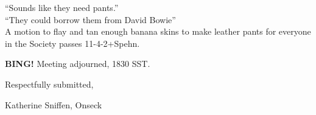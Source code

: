 \documentclass[10pt]{article}
\newcommand{\bing}{{\bf BING!} }
\begin{document}
``Sounds like they need pants.''\\
``They could borrow them from David Bowie''\\

A motion to flay and tan enough banana skins to make leather pants for
everyone in the Society passes 11-4-2+Spehn.

\bing
\noindent
Meeting adjourned, 1830 SST.

\vspace{18pt}

\centerline{Respectfully submitted,}
\centerline{Katherine Sniffen, Onseck}
\end{document}
